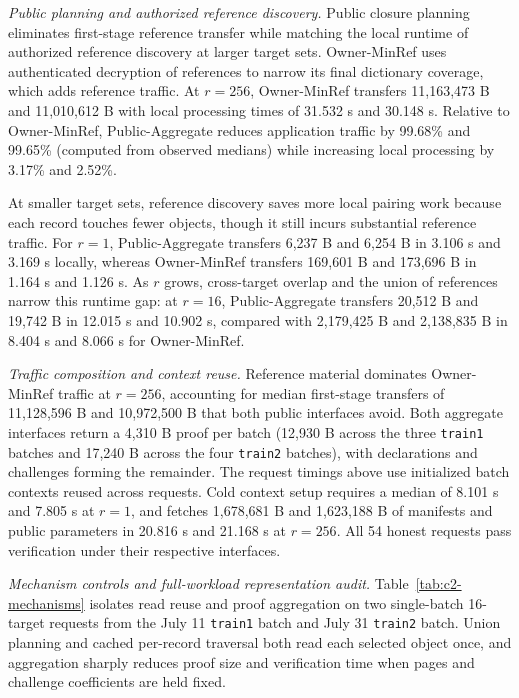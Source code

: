 \documentclass[10pt,journal]{IEEEtran}
\begin{document}
\emph{Public planning and authorized reference discovery.}
Public closure planning eliminates first-stage reference transfer while matching the local runtime of authorized reference discovery at larger target sets. Owner-MinRef uses authenticated decryption of references to narrow its final dictionary coverage, which adds reference traffic. At $r=256$, Owner-MinRef transfers 11,163,473 B and 11,010,612 B with local processing times of 31.532 s and 30.148 s. Relative to Owner-MinRef, Public-Aggregate reduces application traffic by 99.68\% and 99.65\% (computed from observed medians) while increasing local processing by 3.17\% and 2.52\%.

At smaller target sets, reference discovery saves more local pairing work because each record touches fewer objects, though it still incurs substantial reference traffic. For $r=1$, Public-Aggregate transfers 6,237 B and 6,254 B in 3.106 s and 3.169 s locally, whereas Owner-MinRef transfers 169,601 B and 173,696 B in 1.164 s and 1.126 s. As $r$ grows, cross-target overlap and the union of references narrow this runtime gap: at $r=16$, Public-Aggregate transfers 20,512 B and 19,742 B in 12.015 s and 10.902 s, compared with 2,179,425 B and 2,138,835 B in 8.404 s and 8.066 s for Owner-MinRef.

\emph{Traffic composition and context reuse.}
Reference material dominates Owner-MinRef traffic at $r=256$, accounting for median first-stage transfers of 11,128,596 B and 10,972,500 B that both public interfaces avoid. Both aggregate interfaces return a 4,310 B proof per batch (12,930 B across the three \texttt{train1} batches and 17,240 B across the four \texttt{train2} batches), with declarations and challenges forming the remainder. The request timings above use initialized batch contexts reused across requests. Cold context setup requires a median of 8.101 s and 7.805 s at $r=1$, and fetches 1,678,681 B and 1,623,188 B of manifests and public parameters in 20.816 s and 21.168 s at $r=256$. All 54 honest requests pass verification under their respective interfaces.

\emph{Mechanism controls and full-workload representation audit.}
Table~\ref{tab:c2-mechanisms} isolates read reuse and proof aggregation on two single-batch 16-target requests from the July 11 \texttt{train1} batch and July 31 \texttt{train2} batch. Union planning and cached per-record traversal both read each selected object once, and aggregation sharply reduces proof size and verification time when pages and challenge coefficients are held fixed.
\end{document}
